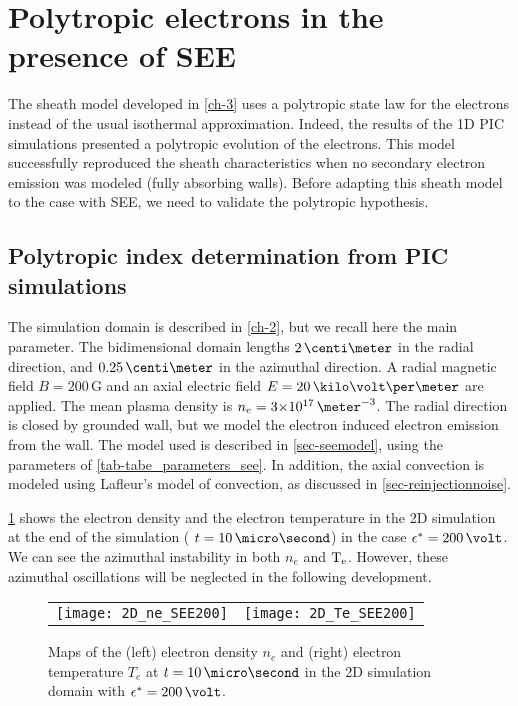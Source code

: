 

\section{Polytropic electrons in the presence of \acs{SEE}}
\label{sec-PIC_poly}

The sheath model developed in \cref{ch-3} uses a polytropic state law for the electrons instead of the usual isothermal approximation.
Indeed, the results of the  \ac{1D} \ac{PIC} simulations presented a polytropic evolution of the electrons.
This model successfully reproduced the sheath characteristics  when no secondary electron emission was modeled (fully absorbing walls).
Before adapting this sheath model to the case with \ac{SEE}, we need to validate the polytropic hypothesis.


\subsection{Polytropic index determination from PIC simulations} \label{subsec-fluid_see_polyfit}


The simulation domain is described in \cref{ch-2}, but we recall here the main parameter.
The bidimensional domain lengths $2\,\centi\meter$ in the radial direction, and $0.25\,\centi\meter$ in the azimuthal direction.
A radial magnetic field $B=200\,$G and an axial electric field $E=20\,\kilo\volt\per\meter$ are applied.
The mean plasma density is $n_e = \sn{3}{17}\,\meter^{-3}$.
The radial direction is closed by grounded wall, but we model the electron induced electron emission from the wall.
The model used is described in \cref{sec-seemodel}, using the parameters of \cref{tab-tabe_parameters_see}.
In addition, the axial convection is modeled using Lafleur's model of convection, as discussed in \cref{sec-reinjectionnoise}.

\cref{fig-2DneTe} shows the electron density and the electron temperature in the \ac{2D} simulation at the end of the simulation ( $t=10\,\micro\second$) in the case $\crover=200\,\volt$.
We can see the azimuthal instability in both $n_e$ and $\mathrm{T_e}$.
However, these azimuthal oscillations will be neglected in the following development. 

\begin{figure}[!h]
  \centering
  \begin{tabular}{@{} c c}
    \texttt{[image: 2D\_ne\_SEE200]} &
    \texttt{[image: 2D\_Te\_SEE200]} \\
  \end{tabular}
  \caption{Maps of the (left) electron density $n_e$ and (right) electron temperature $T_e$ at $t=10\,\micro\second$ in the \acs{2D} simulation domain with $\crover=200\,\volt$.}
  \label{fig-2DneTe}
\end{figure}



